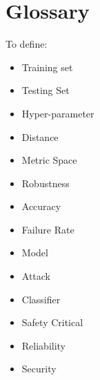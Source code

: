 \chapter*{Glossary}
To define:

\begin{itemize}
    \item Training set
    \item Testing Set
    \item Hyper-parameter
    \item Distance
    \item Metric Space
    \item Robustness
    \item Accuracy
    \item Failure Rate
    \item Model
    \item Attack
    \item Classifier
    \item Safety Critical
    \item Reliability
    \item Security
\end{itemize}
